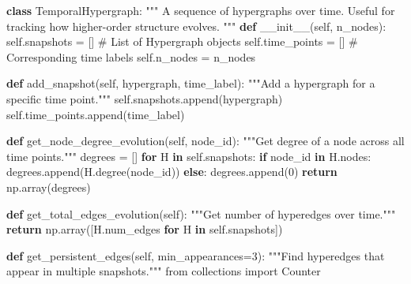 \documentclass[
  11pt,
  letterpaper,
  oneside,
  openany]{book}
\newenvironment{Shaded}{\begin{snugshade}}{\end{snugshade}}
\newcommand{\CommentTok}[1]{\textcolor[rgb]{0.37,0.37,0.37}{#1}}
\newcommand{\ControlFlowTok}[1]{\textcolor[rgb]{0.00,0.23,0.31}{\textbf{#1}}}
\newcommand{\DecValTok}[1]{\textcolor[rgb]{0.68,0.00,0.00}{#1}}
\newcommand{\FunctionTok}[1]{\textcolor[rgb]{0.28,0.35,0.67}{#1}}
\newcommand{\ImportTok}[1]{\textcolor[rgb]{0.00,0.46,0.62}{#1}}
\newcommand{\KeywordTok}[1]{\textcolor[rgb]{0.00,0.23,0.31}{\textbf{#1}}}
\newcommand{\NormalTok}[1]{\textcolor[rgb]{0.00,0.23,0.31}{#1}}
\newcommand{\OperatorTok}[1]{\textcolor[rgb]{0.37,0.37,0.37}{#1}}
\newcommand{\VariableTok}[1]{\textcolor[rgb]{0.07,0.07,0.07}{#1}}
\begin{document}
\begin{Shaded}
\begin{Highlighting}[]
\KeywordTok{class}\NormalTok{ TemporalHypergraph:}
    \CommentTok{"""}
\CommentTok{    A sequence of hypergraphs over time.}
\CommentTok{    }
\CommentTok{    Useful for tracking how higher{-}order structure evolves.}
\CommentTok{    """}
    \KeywordTok{def} \FunctionTok{\_\_init\_\_}\NormalTok{(}\VariableTok{self}\NormalTok{, n\_nodes):}
        \VariableTok{self}\NormalTok{.snapshots }\OperatorTok{=}\NormalTok{ []  }\CommentTok{\# List of Hypergraph objects}
        \VariableTok{self}\NormalTok{.time\_points }\OperatorTok{=}\NormalTok{ []  }\CommentTok{\# Corresponding time labels}
        \VariableTok{self}\NormalTok{.n\_nodes }\OperatorTok{=}\NormalTok{ n\_nodes}
    
    \KeywordTok{def}\NormalTok{ add\_snapshot(}\VariableTok{self}\NormalTok{, hypergraph, time\_label):}
        \CommentTok{"""Add a hypergraph for a specific time point."""}
        \VariableTok{self}\NormalTok{.snapshots.append(hypergraph)}
        \VariableTok{self}\NormalTok{.time\_points.append(time\_label)}
    
    \KeywordTok{def}\NormalTok{ get\_node\_degree\_evolution(}\VariableTok{self}\NormalTok{, node\_id):}
        \CommentTok{"""Get degree of a node across all time points."""}
\NormalTok{        degrees }\OperatorTok{=}\NormalTok{ []}
        \ControlFlowTok{for}\NormalTok{ H }\KeywordTok{in} \VariableTok{self}\NormalTok{.snapshots:}
            \ControlFlowTok{if}\NormalTok{ node\_id }\KeywordTok{in}\NormalTok{ H.nodes:}
\NormalTok{                degrees.append(H.degree(node\_id))}
            \ControlFlowTok{else}\NormalTok{:}
\NormalTok{                degrees.append(}\DecValTok{0}\NormalTok{)}
        \ControlFlowTok{return}\NormalTok{ np.array(degrees)}
    
    \KeywordTok{def}\NormalTok{ get\_total\_edges\_evolution(}\VariableTok{self}\NormalTok{):}
        \CommentTok{"""Get number of hyperedges over time."""}
        \ControlFlowTok{return}\NormalTok{ np.array([H.num\_edges }\ControlFlowTok{for}\NormalTok{ H }\KeywordTok{in} \VariableTok{self}\NormalTok{.snapshots])}
    
    \KeywordTok{def}\NormalTok{ get\_persistent\_edges(}\VariableTok{self}\NormalTok{, min\_appearances}\OperatorTok{=}\DecValTok{3}\NormalTok{):}
        \CommentTok{"""Find hyperedges that appear in multiple snapshots."""}
        \ImportTok{from}\NormalTok{ collections }\ImportTok{import}\NormalTok{ Counter}
        

\end{Highlighting}
\end{Shaded}
\end{document}
